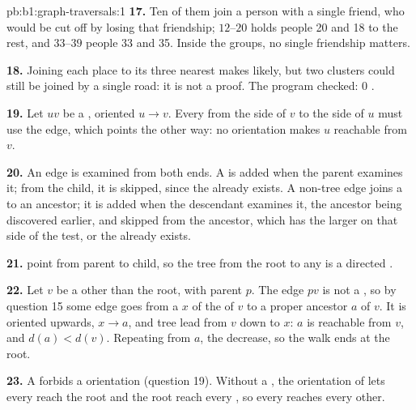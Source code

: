 \begin{solution}{pb:b1:graph-traversals:1}
\textbf{17.} Ten of them join a person with a single friend, who would be cut off by losing that friendship; $12$--$20$
holds people 20 and 18 to the rest, and $33$--$39$ people 33 and 35. Inside the groups, no single friendship matters.

\textbf{18.} Joining each place to its three nearest makes  likely, but two clusters could still be joined by a
single road: it is not a proof. The program checked: 0 .

\textbf{19.} Let $u v$ be a , oriented $u \to v$. Every  from the side of $v$ to the side of $u$ must use the
edge, which points the other way: no orientation makes $u$ reachable from $v$.

\textbf{20.} An edge is examined from both ends. A  is added when the parent examines it; from the child, it
is skipped, since the  already exists. A non-tree edge joins a  to an ancestor; it is added when the
descendant examines it, the ancestor being discovered earlier, and skipped from the ancestor, which has the larger
 on that side of the test, or the  already exists.

\textbf{21.}  point from parent to child, so the tree  from the root to any  is a directed .

\textbf{22.} Let $v$ be a  other than the root, with parent $p$. The edge $p v$ is not a , so by question
15 some edge goes from a  $x$ of the  of $v$ to a proper ancestor $a$ of $v$. It is oriented upwards,
$x \to a$, and tree  lead from $v$ down to $x$: $a$ is reachable from $v$, and $d(a) < d(v)$. Repeating from $a$,
the  decrease, so the walk ends at the root.

\textbf{23.} A  forbids a  orientation (question 19). Without a , the orientation of
 lets every  reach the root and the root reach every , so every  reaches every other.


\end{solution}
